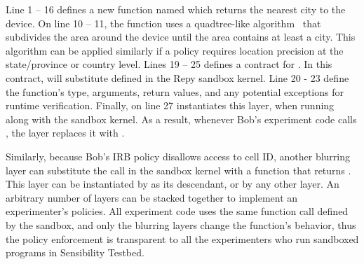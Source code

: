 Line 1 -- 16 defines a new function named  which returns 
the nearest city to the device. On line 10 -- 11, the function 
uses a quadtree-like algorithm~\cite{gruteser2003anonymous} that subdivides 
the area around the device until the area contains at least a city.
This algorithm can be applied similarly if a policy requires location 
precision at the state/province or country level.
Lines 19 -- 25 defines a contract for . 
In this contract, 
 will substitute  defined 
in the Repy sandbox kernel.
Line 20 - 23 define the function's type, arguments,
return values, and any potential exceptions for runtime verification. 
Finally,  on line 27 instantiates this
 layer, when running along with the sandbox kernel. 
As a result, 
whenever Bob's experiment code calls , 
the  layer replaces it with . 

Similarly, because Bob's IRB policy disallows access to cell ID, another blurring layer 
can substitute the  call in the sandbox kernel with a function that
returns . This layer can be instantiated by 
as its descendant, or by any other layer. An arbitrary number of layers can 
be stacked together to implement an experimenter's policies.
%
All experiment code uses the same function call defined by the sandbox, 
and only the blurring layers change the function's behavior, thus 
the policy enforcement is transparent to all the experimenters who run 
sandboxed programs in Sensibility Testbed.




